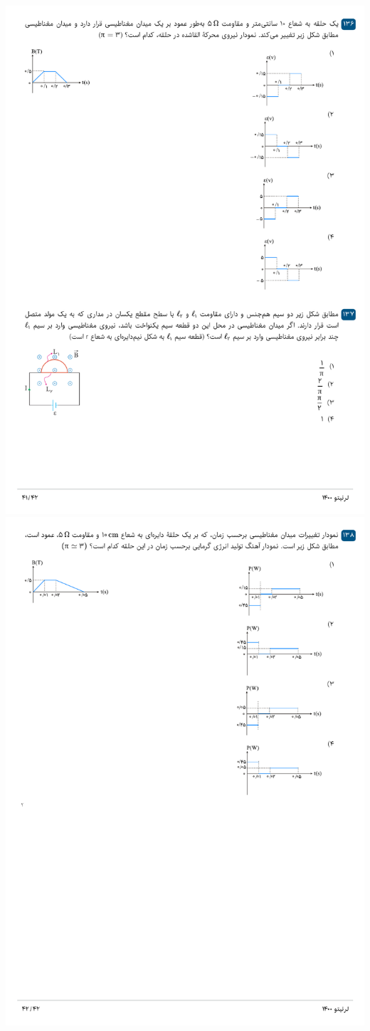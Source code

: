 \documentclass{book}
\begin{document}
\includegraphics[width=\textwidth]{"pages/41"}
\includegraphics[width=\textwidth]{"pages/42"}
\end{document}

